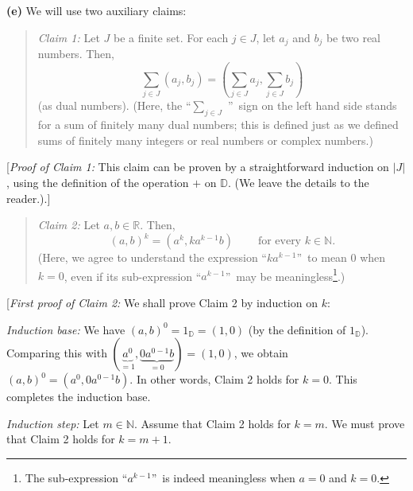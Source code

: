 \documentclass[paper=a4, fontsize=12pt]{scrartcl}%
\let\sumnonlimits\sum
\renewcommand{\sum}{\sumnonlimits\limits}
\theoremstyle{plainsl}
\theoremstyle{definition}
\theoremstyle{remark}
\newenvironment{statement}{\begin{quote}}{\end{quote}}
\begin{document}
\textbf{(e)} We will use two auxiliary claims:

\begin{statement}
\textit{Claim 1:} Let $J$ be a finite set. For each $j\in J$, let $a_{j}$ and
$b_{j}$ be two real numbers. Then,%
\[
\sum_{j\in J}\left(  a_{j},b_{j}\right)  =\left(  \sum_{j\in J}a_{j}%
,\sum_{j\in J}b_{j}\right)
\]
(as dual numbers). (Here, the \textquotedblleft$\sum_{j\in J}$%
\textquotedblright\ sign on the left hand side stands for a sum of finitely
many dual numbers; this is defined just as we defined sums of finitely many
integers or real numbers or complex numbers.)
\end{statement}

[\textit{Proof of Claim 1:} This claim can be proven by a straightforward
induction on $\left\vert J\right\vert $, using the definition of the operation
$+$ on $\mathbb{D}$. (We leave the details to the reader.).]

\begin{statement}
\textit{Claim 2:} Let $a,b\in\mathbb{R}$. Then,%
\[
\left(  a,b\right)  ^{k}=\left(  a^{k},ka^{k-1}b\right)
\ \ \ \ \ \ \ \ \ \ \text{for every }k\in\mathbb{N}.
\]
(Here, we agree to understand the expression \textquotedblleft$ka^{k-1}%
$\textquotedblright\ to mean $0$ when $k=0$, even if its sub-expression
\textquotedblleft$a^{k-1}$\textquotedblright\ may be meaningless\footnote{The
sub-expression \textquotedblleft$a^{k-1}$\textquotedblright\ is indeed
meaningless when $a=0$ and $k=0$.}.)
\end{statement}

[\textit{First proof of Claim 2:} We shall prove Claim 2 by induction on $k$:

\textit{Induction base:} We have $\left(  a,b\right)  ^{0}=1_{\mathbb{D}%
}=\left(  1,0\right)  $ (by the definition of $1_{\mathbb{D}}$). Comparing
this with $\left(  \underbrace{a^{0}}_{=1},\underbrace{0a^{0-1}b}_{=0}\right)
=\left(  1,0\right)  $, we obtain $\left(  a,b\right)  ^{0}=\left(
a^{0},0a^{0-1}b\right)  $. In other words, Claim 2 holds for $k=0$. This
completes the induction base.

\textit{Induction step:} Let $m\in\mathbb{N}$. Assume that Claim 2 holds for
$k=m$. We must prove that Claim 2 holds for $k=m+1$.
\end{document}
